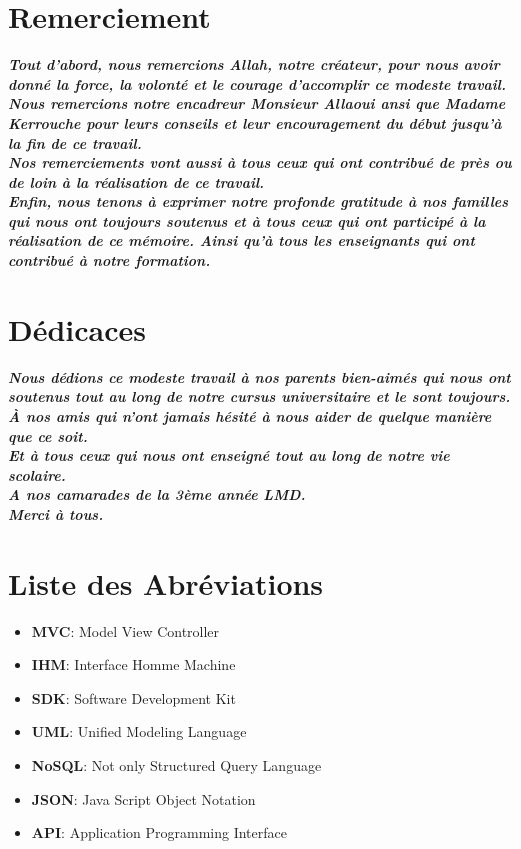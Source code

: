 \documentclass[french, a4paper, 12pt]{report}
\begin{document}
\chapter*{Remerciement}
\begin{center}
\Large \textbf{\textit{Tout d'abord, nous remercions Allah, notre créateur, pour nous avoir donné la force, la volonté et le courage d'accomplir ce modeste travail.\\
Nous remercions notre encadreur Monsieur Allaoui ansi que Madame Kerrouche pour leurs conseils et leur encouragement du début jusqu'à la fin de ce travail.\\
Nos remerciements vont aussi à tous ceux qui ont contribué de près ou de loin à la réalisation de ce travail.\\Enfin, nous tenons à exprimer notre profonde gratitude à nos familles qui nous ont toujours soutenus et à tous ceux qui ont participé à la réalisation de ce mémoire. Ainsi qu'à tous les enseignants qui ont contribué à notre formation.}}
\end{center}

\chapter*{Dédicaces}
\begin{center}
\Large \textbf{\textit{Nous dédions ce modeste travail à nos parents bien-aimés qui nous ont soutenus tout au long de notre cursus universitaire et le sont toujours.\\
À nos amis qui n'ont jamais hésité à nous aider de quelque manière que ce soit.\\
Et à tous ceux qui nous ont enseigné tout au long de notre vie scolaire.\\
A nos camarades de la 3ème année LMD.\\
Merci à tous.}}
\end{center}



\tableofcontents

\newpage
{}
\listoffigures

\newpage
{}
\listoftables


\newpage
\chapter*{Liste des Abréviations}
	\begin{itemize}
		\item \textbf{MVC}:  Model View Controller
		\item \textbf{IHM}: Interface Homme Machine
		\item \textbf{SDK}: Software Development Kit
		\item \textbf{UML}: Unified Modeling Language
		\item \textbf{NoSQL}: Not only Structured Query Language
		\item \textbf{JSON}:  Java Script Object Notation
		\item \textbf{API}:  Application Programming Interface
	\end{itemize}
\end{document}
